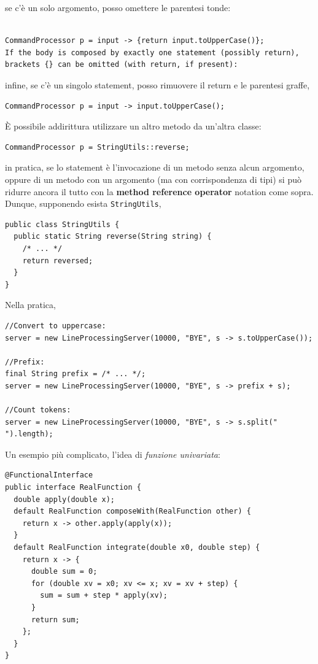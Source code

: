 \documentclass[\fontsizeclass,twocolumn]{\classname}
\theoremstyle{definition}
\theoremstyle{definition}
\begin{document}
se c'è un solo argomento, posso omettere le parentesi tonde:

\begin{lstlisting}

CommandProcessor p = input -> {return input.toUpperCase()};
If the body is composed by exactly one statement (possibly return), brackets {} can be omitted (with return, if present):

\end{lstlisting}

infine, se c'è un singolo statement, posso rimuovere il return e le parentesi graffe,

\begin{lstlisting}
CommandProcessor p = input -> input.toUpperCase();
\end{lstlisting}

È possibile addirittura utilizzare un altro metodo da un'altra classe:


\begin{lstlisting}
CommandProcessor p = StringUtils::reverse;
\end{lstlisting}

in pratica, se lo statement è l'invocazione di un metodo senza alcun argomento,
oppure di un metodo con un argomento (ma con corrispondenza di tipi)
si può ridurre ancora il tutto con la \textbf{method reference operator}
notation come sopra. Dunque, supponendo esista \texttt{StringUtils},

\begin{lstlisting}
public class StringUtils {
  public static String reverse(String string) {
    /* ... */
    return reversed;
  }
}
\end{lstlisting}

Nella pratica,

\begin{lstlisting}
//Convert to uppercase:
server = new LineProcessingServer(10000, "BYE", s -> s.toUpperCase());

//Prefix:
final String prefix = /* ... */;
server = new LineProcessingServer(10000, "BYE", s -> prefix + s);

//Count tokens:
server = new LineProcessingServer(10000, "BYE", s -> s.split(" ").length);
\end{lstlisting}

Un esempio più complicato, l'idea di \emph{funzione univariata}:

\begin{lstlisting}
@FunctionalInterface
public interface RealFunction {  
  double apply(double x);
  default RealFunction composeWith(RealFunction other) {
    return x -> other.apply(apply(x));
  }
  default RealFunction integrate(double x0, double step) {
    return x -> {
      double sum = 0;
      for (double xv = x0; xv <= x; xv = xv + step) {
        sum = sum + step * apply(xv);
      }
      return sum;
    };
  }
}
\end{lstlisting}
\end{document}
